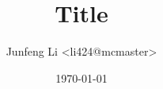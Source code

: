 \ifx \mytitle \undefined
    \newcommand{\mytitle}{Title}
\fi

\ifx \myauthor \undefined
    \newcommand{\myauthor}{Junfeng Li <li424@mcmaster>}
\fi

\ifx \mydate \undefined
    \newcommand{\mydate}{\today}
\fi

\title{\mytitle{}}
\author{\myauthor{}}
\date{\mydate{}}




\maketitle

